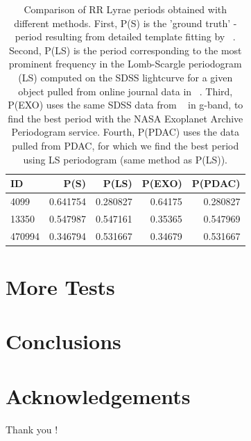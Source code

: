 \documentclass[DM,lsstdraft,toc,usenatbib]{lsstdoc}
\begin{document}
\begin{table}
\centering
\caption{Comparison of RR Lyrae periods obtained with different methods. First, P(S) is the 'ground truth' -  period resulting from detailed template fitting by ~\citep{sesar2010}. Second, P(LS) is the period corresponding to the most prominent frequency in the Lomb-Scargle periodogram  (LS) computed on the SDSS lightcurve for a given object pulled from online journal data in ~\citep{sesar2010}. Third, P(EXO) uses the same SDSS data from ~\citep{sesar2010} in g-band, to find the best period with the NASA Exoplanet Archive Periodogram service.  Fourth, P(PDAC) uses the data pulled from PDAC, for which we find  the best period using  LS periodogram (same method as P(LS)).}
\label{tab:periods}
\begin{tabular}{ l|rrrr } 
\hline
 ID      & P(S)         & P(LS)      & P(EXO)       & P(PDAC) \\ 
\hline
 4099    & 0.641754     & 0.280827   & 0.64175      &  0.280827 \\ 
 13350   & 0.547987     & 0.547161   & 0.35365      &  0.547969  \\ 
 470994  & 0.346794     & 0.531667   & 0.34679      &  0.531667  \\ 
\end{tabular}
\end{table}






\section{More Tests}

\section{Conclusions}

\section*{Acknowledgements}
Thank you ! 




\end{document}
